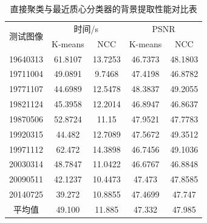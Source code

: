 \documentclass[UTF8,a4paper,twoside]{ctexart}
\begin{document}
\begin{table}[H]
\centering
\caption{直接聚类与最近质心分类器的背景提取性能对比表}
\label{compareTable}
\begin{tabular}{ccccc}
  \hline
  \multirow{2}{*}{测试图像} & \multicolumn{2}{c}{时间/s} & \multicolumn{2}{c}{PSNR} \\
                            & K-means     & NCC       & K-means     & NCC       \\
  \hline
  19640313              & 61.8107     & 13.7253    & 46.7373     & 48.1803    \\
  19711004              & 49.0891     & 9.7468     & 47.4198     & 46.8782    \\
  19771107              & 44.6989     & 12.5478    & 48.3837     & 49.2055    \\
  19821124              & 45.3958     & 12.2014    & 46.8947     & 46.8637    \\
  19870506              & 52.8724     & 11.15      & 47.9521     & 47.7783    \\
  19920315              & 44.482      & 12.7089    & 47.5672     & 49.3512    \\
  19971112              & 62.472      & 14.3898    & 46.7456     & 49.1036    \\
  20030314              & 48.7847     & 11.0422    & 46.6767     & 46.8848    \\
  20090511              & 42.1237     & 10.4473    & 47.473      & 47.8585    \\
  20140725              & 39.272      & 10.8855    & 47.4699     & 47.747    \\
  \hline
  平均值                 & 49.100      & 11.885     & 47.332      & 47.985    \\
  \hline
                                                                   
\end{tabular}
\end{table}


\end{document}
